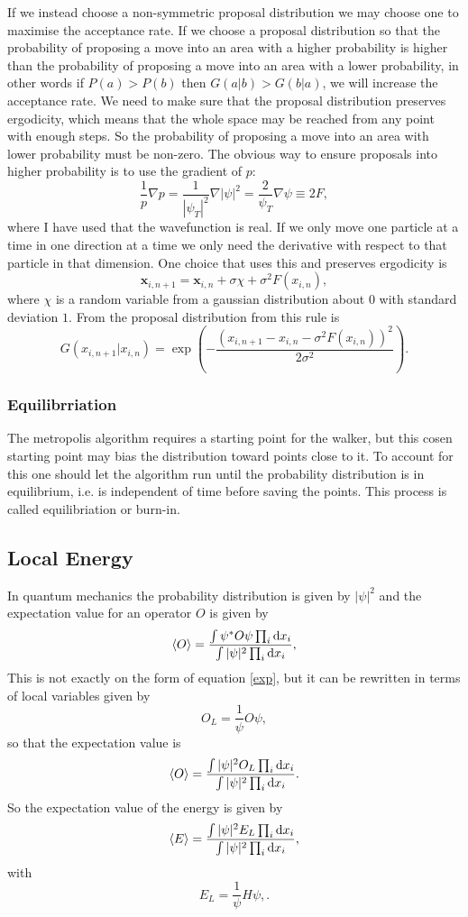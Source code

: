 \documentclass[a4paper,English,10pt]{article}
\newcommand{\bb}[1]{\boldsymbol{#1}}
\newcommand{\dd}{\mathrm{d}}
\newcommand{\be}{\begin{equation}}
\newcommand{\ee}{\end{equation}}
\newcommand{\f}{\frac}
\renewcommand{\braket}{\Braket}
\begin{document}
If we instead choose a non-symmetric proposal distribution we may choose one to maximise the acceptance rate.
If we choose a proposal distribution so that the probability of proposing a move into an area with a higher probability is higher than
the probability of proposing a move into an area with a lower probability, in other words
if $P(a)>P(b)$ then $G(a|b)>G(b|a)$, we will increase the acceptance rate. We need to make sure that the proposal distribution preserves ergodicity,
which means that the whole space may be reached from any point with enough steps. So the probability of proposing a move into an area with lower probability must be non-zero.
The obvious way to ensure proposals into higher probability is to use the gradient of $p$:
\be
\f{1}{p}\nabla p = \f{1}{|\psi_T|^2}\nabla|\psi|^2 = \f{2}{\psi_T}\nabla\psi \equiv 2F, \label{eq:qforce} 
\ee
where I have used that the wavefunction is real. If we only move one particle at a time in one direction at a time we only need the derivative with respect to
that particle in that dimension. 
One choice that uses this and preserves ergodicity is
\be
\bb{x}_{i,n+1} = \bb{x}_{i,n} + \sigma \chi + \sigma^2F(x_{i,n}),\label{eq:prop}
\ee
where $\chi$ is a random variable from a gaussian distribution about $0$ with standard deviation $1$.
From \cite{mortenbok} the proposal distribution from this rule is
\be
G(x_{i,n+1}|x_{i,n}) = \exp\left(-\f{(x_{i,n+1} - x_{i,n} - \sigma^2F(x_{i,n}))^2}{2\sigma^2}\right).
\ee

\subsubsection{Equilibrriation}
The metropolis algorithm requires a starting point for the walker, but this cosen starting point may bias the distribution toward points close to it.
To account for this one should let the algorithm run until the probability distribution is in equilibrium, i.e. is independent of time before saving the points.
This process is called equilibriation or burn-in.

\subsection{Local Energy}
In quantum mechanics the probability distribution is given by $|\psi|^2$ and the expectation value for an operator $O$ is given by
\be
\braket{O} = \f{\int\psi^*O\psi\prod_i\dd x_i}{\int|\psi|^2\prod_i\dd x_i},
\ee
This is not exactly on the form of equation \ref{exp}, but it can be rewritten in terms of local variables given by
\be
O_L = \f{1}{\psi}O\psi, \label{localdef}
\ee
so that the expectation value is
\be
\braket{O} =  \f{\int|\psi|^2O_L\prod_i\dd x_i}{\int|\psi|^2\prod_i\dd x_i}.
\ee
So the expectation value of the energy is given by
\be
\braket{E} =  \f{\int|\psi|^2E_L\prod_i\dd x_i}{\int|\psi|^2\prod_i\dd x_i},
\ee
with
\be
E_L = \f{1}{\psi}H\psi, \label{localEdef}.
\ee
\end{document}

